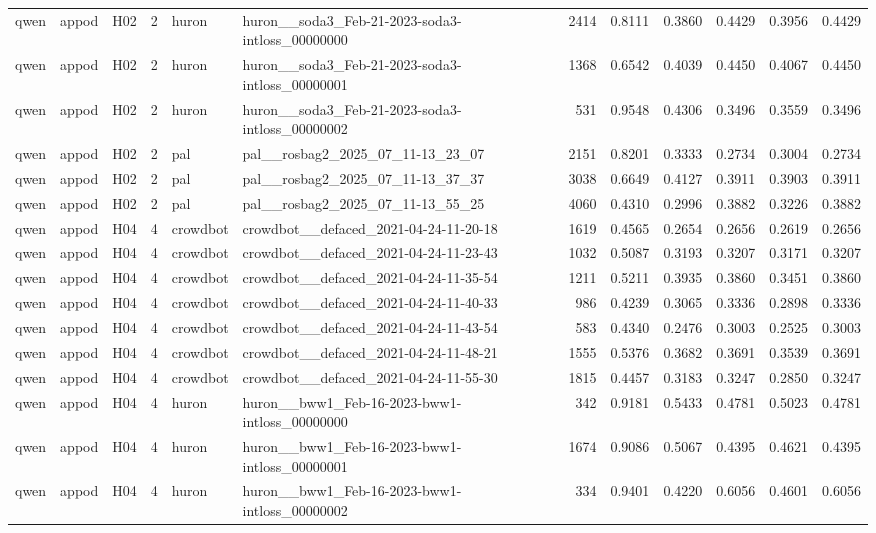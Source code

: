 \begin{table}[tbp]
\begin{tabular}{lllrllrrrrrr}
qwen & appod & H02 & 2 & huron & huron\_\_soda3\_Feb-21-2023-soda3-intloss\_00000000 & 2414 & 0.8111 & 0.3860 & 0.4429 & 0.3956 & 0.4429 \\
qwen & appod & H02 & 2 & huron & huron\_\_soda3\_Feb-21-2023-soda3-intloss\_00000001 & 1368 & 0.6542 & 0.4039 & 0.4450 & 0.4067 & 0.4450 \\
qwen & appod & H02 & 2 & huron & huron\_\_soda3\_Feb-21-2023-soda3-intloss\_00000002 & 531 & 0.9548 & 0.4306 & 0.3496 & 0.3559 & 0.3496 \\
qwen & appod & H02 & 2 & pal & pal\_\_rosbag2\_2025\_07\_11-13\_23\_07 & 2151 & 0.8201 & 0.3333 & 0.2734 & 0.3004 & 0.2734 \\
qwen & appod & H02 & 2 & pal & pal\_\_rosbag2\_2025\_07\_11-13\_37\_37 & 3038 & 0.6649 & 0.4127 & 0.3911 & 0.3903 & 0.3911 \\
qwen & appod & H02 & 2 & pal & pal\_\_rosbag2\_2025\_07\_11-13\_55\_25 & 4060 & 0.4310 & 0.2996 & 0.3882 & 0.3226 & 0.3882 \\
qwen & appod & H04 & 4 & crowdbot & crowdbot\_\_defaced\_2021-04-24-11-20-18 & 1619 & 0.4565 & 0.2654 & 0.2656 & 0.2619 & 0.2656 \\
qwen & appod & H04 & 4 & crowdbot & crowdbot\_\_defaced\_2021-04-24-11-23-43 & 1032 & 0.5087 & 0.3193 & 0.3207 & 0.3171 & 0.3207 \\
qwen & appod & H04 & 4 & crowdbot & crowdbot\_\_defaced\_2021-04-24-11-35-54 & 1211 & 0.5211 & 0.3935 & 0.3860 & 0.3451 & 0.3860 \\
qwen & appod & H04 & 4 & crowdbot & crowdbot\_\_defaced\_2021-04-24-11-40-33 & 986 & 0.4239 & 0.3065 & 0.3336 & 0.2898 & 0.3336 \\
qwen & appod & H04 & 4 & crowdbot & crowdbot\_\_defaced\_2021-04-24-11-43-54 & 583 & 0.4340 & 0.2476 & 0.3003 & 0.2525 & 0.3003 \\
qwen & appod & H04 & 4 & crowdbot & crowdbot\_\_defaced\_2021-04-24-11-48-21 & 1555 & 0.5376 & 0.3682 & 0.3691 & 0.3539 & 0.3691 \\
qwen & appod & H04 & 4 & crowdbot & crowdbot\_\_defaced\_2021-04-24-11-55-30 & 1815 & 0.4457 & 0.3183 & 0.3247 & 0.2850 & 0.3247 \\
qwen & appod & H04 & 4 & huron & huron\_\_bww1\_Feb-16-2023-bww1-intloss\_00000000 & 342 & 0.9181 & 0.5433 & 0.4781 & 0.5023 & 0.4781 \\
qwen & appod & H04 & 4 & huron & huron\_\_bww1\_Feb-16-2023-bww1-intloss\_00000001 & 1674 & 0.9086 & 0.5067 & 0.4395 & 0.4621 & 0.4395 \\
qwen & appod & H04 & 4 & huron & huron\_\_bww1\_Feb-16-2023-bww1-intloss\_00000002 & 334 & 0.9401 & 0.4220 & 0.6056 & 0.4601 & 0.6056 \\

\end{tabular}
\end{table}
